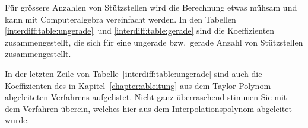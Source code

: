 Für grössere Anzahlen von Stützstellen wird die Berechnung etwas mühsam
und kann mit Computeralgebra vereinfacht werden.
In den Tabellen \ref{interdiff:table:ungerade} und \ref{interdiff:table:gerade}
sind die Koeffizienten zusammengestellt, die sich für eine ungerade
bzw.~gerade Anzahl von Stützstellen zusammengestellt.
%

In der letzten Zeile von Tabelle~\ref{interdiff:table:ungerade} sind
auch die Koeffizienten des in Kapitel~\ref{chapter:ableitung} aus
dem Taylor-Polynom abgeleiteten Verfahrens aufgelistet.
Nicht ganz überraschend stimmen Sie mit dem Verfahren überein, welches
hier aus dem Interpolationspolynom abgeleitet wurde.
%


